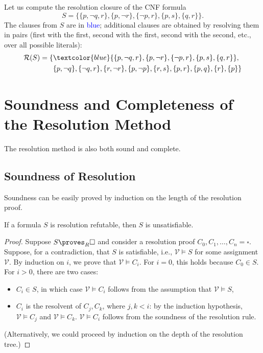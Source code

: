\begin{example}
    Let us compute the resolution closure of the CNF formula 
    $$
    S=\{\{p,\neg q,r\},\{p,\neg r\},\{\neg p,r\},\{p,s\},\{q,r\}\}.
    $$ 
    The clauses from $S$ are in \textcolor{blue}{blue}; additional clauses are obtained by resolving them in pairs (first with the first, second with the first, second with the second, etc., over all possible literals):
    \begin{align*}
        \mathcal R(S)=\{&\textcolor{blue}{\{p,\neg q,r\},\{p,\neg r\},\{\neg p,r\},\{p,s\},\{q,r\}},\\&\{p,\neg q\},\{\neg q,r\},\{r,\neg r\},\{p,\neg p\},\{r,s\},\{p,r\},\{p,q\},\{r\},\{p\}\}
    \end{align*}
\end{example}

\section{Soundness and Completeness of the Resolution Method}

The resolution method is also both sound and complete. 

\subsection{Soundness of Resolution}

Soundness can be easily proved by induction on the length of the resolution proof.

\begin{theorem}\label{theorem:soundness-resolution}
If a formula $S$ is resolution refutable, then $S$ is unsatisfiable.
\end{theorem}
\begin{proof}
    Suppose $S \proves_R \square$ and consider a resolution proof $C_0, C_1, \dots, C_n = \square$. Suppose, for a contradiction, that $S$ is satisfiable, i.e., $\mathcal{V} \models S$ for some assignment $\mathcal{V}$. By induction on $i$, we prove that $\mathcal{V} \models C_i$. For $i = 0$, this holds because $C_0 \in S$. For $i > 0$, there are two cases:
    \begin{itemize}
        \item $C_i \in S$, in which case $\mathcal{V} \models C_i$ follows from the assumption that $\mathcal{V} \models S$,
        \item $C_i$ is the resolvent of $C_j, C_k$, where $j, k < i$: by the induction hypothesis, $\mathcal{V} \models C_j$ and $\mathcal{V} \models C_k$. $\mathcal{V} \models C_i$ follows from the soundness of the resolution rule.
    \end{itemize}
    (Alternatively, we could proceed by induction on the depth of the resolution tree.)
\end{proof}

